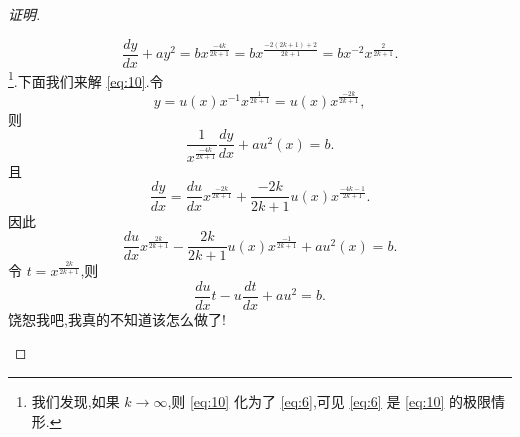 \documentclass[a4paper, 12pt]{article} %
\begin{document}
\begin{CJK}{UTF8}{gkai}
\begin{proof}[证明]
\begin{itemize}
  \begin{equation}
    \label{eq:10}
    \frac{dy}{dx}+ay^2=bx^{\frac{-4k}{2k+1}}=bx^{\frac{-2(2k+1)+2}{2k+1}}=bx^{-2}x^{\frac{2}{2k+1}}.
  \end{equation}
\footnote{我们发现,如果 $k\to \infty$,则 \eqref{eq:10} 化为了 \eqref{eq:6},可见
\eqref{eq:6} 是 \eqref{eq:10} 的极限情形.}.下面我们来解
\eqref{eq:10}.令
$$
y=u(x)x^{-1}x^{\frac{1}{2k+1}}=u(x)x^{\frac{-2k}{2k+1}},
$$
则
\begin{equation}
  \label{eq:11}
  \frac{1}{x^{\frac{-4k}{2k+1}}}\frac{dy}{dx}+au^2(x)=b.
\end{equation}
且
$$
\frac{dy}{dx}=\frac{du}{dx}x^{\frac{-2k}{2k+1}}+\frac{-2k}{2k+1}u(x)x^{\frac{-4k-1}{2k+1}}.
$$
因此
\begin{equation}
  \label{eq:12}
  \frac{du}{dx}x^{\frac{2k}{2k+1}}-\frac{2k}{2k+1}u(x)x^{\frac{-1}{2k+1}}+au^2(x)=b.
\end{equation}
令 $t=x^{\frac{2k}{2k+1}}$,则
\begin{equation}
  \label{eq:13}
  \frac{du}{dx}t-u \frac{dt}{dx}+au^2=b.
\end{equation}
饶恕我吧,我真的不知道该怎么做了!
    \end{itemize}
  \end{proof}
  
  
  
  
  
\end{CJK}
\end{document}
